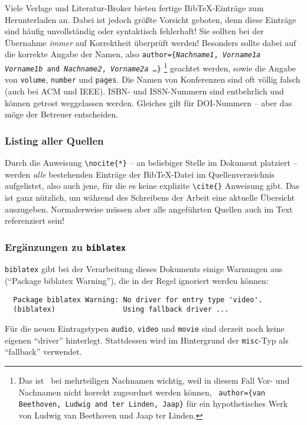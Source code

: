 Viele Verlage und Literatur-Broker bieten fertige BibTeX-Einträge zum Herunterladen an.
Dabei ist jedoch größte Vorsicht geboten, denn diese Einträge sind häufig
unvollständig oder syntaktisch fehlerhaft!
Sie sollten bei der Übernahme \emph{immer} auf Korrektheit überprüft werden!
Besonders sollte dabei auf die korrekte Angabe der Namen, also 
\texttt{author=\{\textit{Nachname1}, \textit{Vorname1a} \emph{Vorname1b} 
and \textit{Nachname2}, \textit{Vorname2a} \ldots \}}%
\footnote{Das ist \va\ bei mehrteiligen Nachnamen wichtig, weil in diesem Fall
Vor- und Nachnamen nicht korrekt zugeordnet werden können, \zB\ 
\texttt{author=\{van Beethoven, Ludwig and ter Linden, Jaap\}}
für ein hypothetisches Werk von Ludwig van Beethoven und Jaap ter Linden.}
geachtet werden, sowie die Angabe von \texttt{volume}, \texttt{number} und \texttt{pages}.
Die Namen von Konferenzen sind oft völlig falsch (auch bei ACM und IEEE).
ISBN- und ISSN-Nummern sind entbehrlich und können getrost weggelassen werden.
Gleiches gilt für DOI-Nummern -- aber das möge der Betreuer entscheiden.
 

\subsubsection{Listing aller Quellen}

Durch die Anweisung \verb!\nocite{*}! -- an beliebiger Stelle im Dokument platziert -- werden \emph{alle} bestehenden Einträge der BibTeX-Datei im Quellenverzeichnis aufgelistet, also auch jene, für die es keine explizite \verb!\cite{}! Anweisung gibt. Das ist ganz nützlich, um während des Schreibens der Arbeit eine aktuelle Übersicht auszugeben. Normalerweise müssen aber alle angeführten Quellen auch im Text referenziert sein!


\subsubsection{Ergänzungen zu \texttt{biblatex}}

\texttt{biblatex} gibt bei der Verarbeitung dieses Dokuments einige Warnungen aus ("`Package biblatex Warning"'), 
die in der Regel ignoriert werden können:
\begin{small}
\begin{verbatim}
  Package biblatex Warning: No driver for entry type 'video'.
  (biblatex)                Using fallback driver ...
\end{verbatim}
\end{small}
Für die neuen Eintragstypen \texttt{audio}, \texttt{video} und \texttt{movie} sind derzeit 
noch keine eigenen "`driver"' hinterlegt. Stattdessen wird im Hintergrund der \texttt{misc}-Typ 
als "`fallback"' verwendet.

